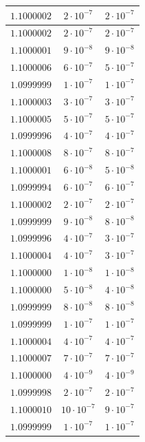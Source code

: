 \begin{table}[h]
\begin{tabular}{|c|c|c|}
       \hline
       $1.1000002$ & $2 \cdot 10^{-7}$ & $2 \cdot 10^{-7}$ \\
       \hline
       $1.1000002$ & $2 \cdot 10^{-7}$ & $2 \cdot 10^{-7}$ \\
       \hline
       $1.1000001$ & $9 \cdot 10^{-8}$ & $9 \cdot 10^{-8}$ \\
       \hline
       $1.1000006$ & $6 \cdot 10^{-7}$ & $5 \cdot 10^{-7}$ \\
       \hline
       $1.0999999$ & $1 \cdot 10^{-7}$ & $1 \cdot 10^{-7}$ \\
       \hline
       $1.1000003$ & $3 \cdot 10^{-7}$ & $3 \cdot 10^{-7}$ \\
       \hline
       $1.1000005$ & $5 \cdot 10^{-7}$ & $5 \cdot 10^{-7}$ \\
       \hline
       $1.0999996$ & $4 \cdot 10^{-7}$ & $4 \cdot 10^{-7}$ \\
       \hline
       $1.1000008$ & $8 \cdot 10^{-7}$ & $8 \cdot 10^{-7}$ \\
       \hline
       $1.1000001$ & $6 \cdot 10^{-8}$ & $5 \cdot 10^{-8}$ \\
       \hline
       $1.0999994$ & $6 \cdot 10^{-7}$ & $6 \cdot 10^{-7}$ \\
       \hline
       $1.1000002$ & $2 \cdot 10^{-7}$ & $2 \cdot 10^{-7}$ \\
       \hline
       $1.0999999$ & $9 \cdot 10^{-8}$ & $8 \cdot 10^{-8}$ \\
       \hline
       $1.0999996$ & $4 \cdot 10^{-7}$ & $3 \cdot 10^{-7}$ \\
       \hline
       $1.1000004$ & $4 \cdot 10^{-7}$ & $3 \cdot 10^{-7}$ \\
       \hline
       $1.1000000$ & $1 \cdot 10^{-8}$ & $1 \cdot 10^{-8}$ \\
       \hline
       $1.1000000$ & $5 \cdot 10^{-8}$ & $4 \cdot 10^{-8}$ \\
       \hline
       $1.0999999$ & $8 \cdot 10^{-8}$ & $8 \cdot 10^{-8}$ \\
       \hline
       $1.0999999$ & $1 \cdot 10^{-7}$ & $1 \cdot 10^{-7}$ \\
       \hline
       $1.1000004$ & $4 \cdot 10^{-7}$ & $4 \cdot 10^{-7}$ \\
       \hline
       $1.1000007$ & $7 \cdot 10^{-7}$ & $7 \cdot 10^{-7}$ \\
       \hline
       $1.1000000$ & $4 \cdot 10^{-9}$ & $4 \cdot 10^{-9}$ \\
       \hline
       $1.0999998$ & $2 \cdot 10^{-7}$ & $2 \cdot 10^{-7}$ \\
       \hline
       $1.1000010$ & $10 \cdot 10^{-7}$ & $9 \cdot 10^{-7}$ \\
       \hline
       $1.0999999$ & $1 \cdot 10^{-7}$ & $1 \cdot 10^{-7}$ \\
       \hline
   \end{tabular}
\end{table}


